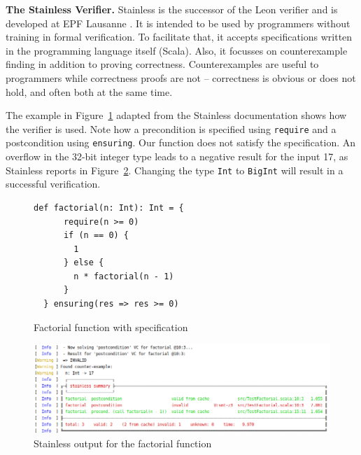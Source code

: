 \documentclass[runningheads]{llncs}
\renewcommand{\paragraph}{\textbf}%
\begin{document}
\paragraph{The Stainless Verifier.} Stainless is the successor of the
Leon verifier and is developed at EPF Lausanne
\cite{DBLP:conf/ecoop/BlancKKS13,DBLP:conf/pldi/VoirolKK15,DBLP:conf/pldi/BlancK15}. It
is intended to be used by programmers without training in formal
verification. To facilitate that, it accepts specifications written in
the programming language itself (Scala). Also, it focusses on
counterexample finding in addition to proving
correctness. Counterexamples are useful to programmers while
correctness proofs are not -- correctness is obvious or does not hold,
and often both at the same time.

The example in Figure~\ref{fig:factorial} adapted from the Stainless
documentation \cite{Stainless:documentation} shows how the verifier is
used. Note how a precondition is specified using \texttt{require} and
a postcondition using \texttt{ensuring}. Our function does not satisfy
the specification. An overflow in the 32-bit integer type leads to a
negative result for the input 17, as Stainless reports in
Figure~\ref{fig:failed}. Changing the type \texttt{Int} to
\texttt{BigInt} will result in a successful verification.


\begin{figure}
\begin{lstlisting}[style=scala]
  def factorial(n: Int): Int = {
      require(n >= 0)
      if (n == 0) {
        1
      } else {
        n * factorial(n - 1)
      }
  } ensuring(res => res >= 0)
\end{lstlisting}
	\caption{Factorial function with specification}
	\label{fig:factorial}
\end{figure}

\begin{figure}
	\centering
		\includegraphics[width=\textwidth]{output1.png}
	\caption{Stainless output for the factorial function}
	\label{fig:failed}
\end{figure}
\end{document}
